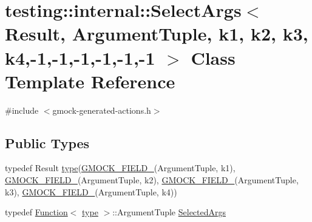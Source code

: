 \hypertarget{classtesting_1_1internal_1_1_select_args_3_01_result_00_01_argument_tuple_00_01k1_00_01k2_00_01k69e12b55446b1a17c0daec13dac1d86f}{}\section{testing\+:\+:internal\+:\+:Select\+Args$<$ Result, Argument\+Tuple, k1, k2, k3, k4,-\/1,-\/1,-\/1,-\/1,-\/1,-\/1 $>$ Class Template Reference}
\label{classtesting_1_1internal_1_1_select_args_3_01_result_00_01_argument_tuple_00_01k1_00_01k2_00_01k69e12b55446b1a17c0daec13dac1d86f}


{\ttfamily \#include $<$gmock-\/generated-\/actions.\+h$>$}

\subsection*{Public Types}
\begin{DoxyCompactItemize}
\item 
typedef Result \hyperlink{classtesting_1_1internal_1_1_select_args_3_01_result_00_01_argument_tuple_00_01k1_00_01k2_00_01k69e12b55446b1a17c0daec13dac1d86f_ab3943ec249f6a4830eca541202529ec3}{type}(\hyperlink{gmock-generated-actions_8h_a6eb3ce92b0613603057a20ec9e593317}{G\+M\+O\+C\+K\+\_\+\+F\+I\+E\+L\+D\+\_\+}(Argument\+Tuple, k1), \hyperlink{gmock-generated-actions_8h_a6eb3ce92b0613603057a20ec9e593317}{G\+M\+O\+C\+K\+\_\+\+F\+I\+E\+L\+D\+\_\+}(Argument\+Tuple, k2), \hyperlink{gmock-generated-actions_8h_a6eb3ce92b0613603057a20ec9e593317}{G\+M\+O\+C\+K\+\_\+\+F\+I\+E\+L\+D\+\_\+}(Argument\+Tuple, k3), \hyperlink{gmock-generated-actions_8h_a6eb3ce92b0613603057a20ec9e593317}{G\+M\+O\+C\+K\+\_\+\+F\+I\+E\+L\+D\+\_\+}(Argument\+Tuple, k4))
\item 
typedef \hyperlink{structtesting_1_1internal_1_1_function}{Function}$<$ \hyperlink{classtesting_1_1internal_1_1_select_args_3_01_result_00_01_argument_tuple_00_01k1_00_01k2_00_01k69e12b55446b1a17c0daec13dac1d86f_ab3943ec249f6a4830eca541202529ec3}{type} $>$\+::Argument\+Tuple \hyperlink{classtesting_1_1internal_1_1_select_args_3_01_result_00_01_argument_tuple_00_01k1_00_01k2_00_01k69e12b55446b1a17c0daec13dac1d86f_abe7050ab51f411bf8f15dd672b91d3be}{Selected\+Args}
\end{DoxyCompactItemize}
